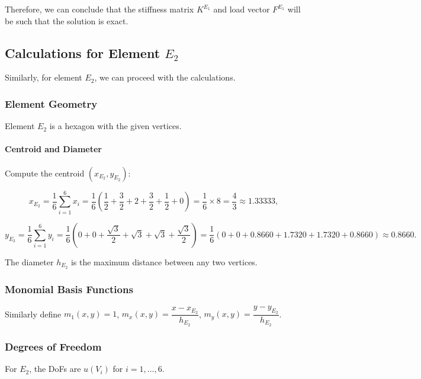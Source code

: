 \documentclass[class=article, crop=false]{standalone}
\begin{document}
Therefore, we can conclude that the stiffness matrix \( K^{E_1} \) and load vector \( F^{E_1} \) will be such that the solution is exact.

\subsection{Calculations for Element \( E_2 \)}

Similarly, for element \( E_2 \), we can proceed with the calculations.

\subsubsection{Element Geometry}

Element \( E_2 \) is a hexagon with the given vertices.

\paragraph{Centroid and Diameter}

Compute the centroid \( (x_{E_2}, y_{E_2}) \):

\[
x_{E_2} = \dfrac{1}{6} \sum_{i=1}^{6} x_i = \dfrac{1}{6} \left( \dfrac{1}{2} + \dfrac{3}{2} + 2 + \dfrac{3}{2} + \dfrac{1}{2} + 0 \right) = \dfrac{1}{6} \times 8 = \dfrac{4}{3} \approx 1.33333,
\]

\[
y_{E_2} = \dfrac{1}{6} \sum_{i=1}^{6} y_i = \dfrac{1}{6} \left( 0 + 0 + \dfrac{\sqrt{3}}{2} + \sqrt{3} + \sqrt{3} + \dfrac{\sqrt{3}}{2} \right) = \dfrac{1}{6} \left( 0 + 0 + 0.8660 + 1.7320 + 1.7320 + 0.8660 \right) \approx 0.8660.

\]

The diameter \( h_{E_2} \) is the maximum distance between any two vertices.

\subsubsection{Monomial Basis Functions}

Similarly define \( m_1(x, y) = 1 \), \( m_x(x, y) = \dfrac{x - x_{E_2}}{h_{E_2}} \), \( m_y(x, y) = \dfrac{y - y_{E_2}}{h_{E_2}} \).

\subsubsection{Degrees of Freedom}

For \( E_2 \), the DoFs are \( u(V_i) \) for \( i = 1, \dots, 6 \).
\end{document}
